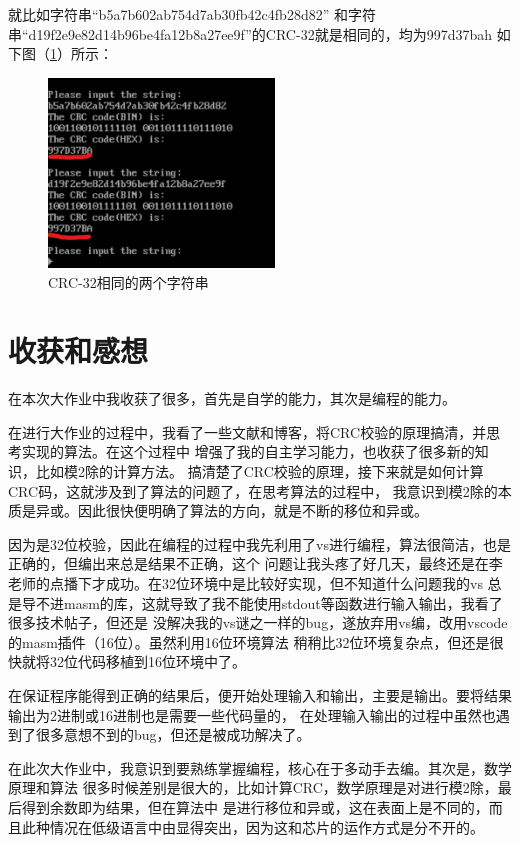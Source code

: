 \documentclass[UTF-8, a4paper, 12pt]{ctexart}
\begin{document}
就比如字符串“b5a7b602ab754d7ab30fb42c4fb28d82”
和字符串\newline “d19f2e9e82d14b96be4fa12b8a27ee9f”的CRC-32就是相同的，均为997d37bah
如下图（\ref{same}）所示：

\begin{figure}[htbp]
    \begin{center}
        \includegraphics[width=6cm]{fig/ff.jpg}
    \end{center}
    \caption{CRC-32相同的两个字符串}
    \label{same}
\end{figure}
\section{收获和感想}

在本次大作业中我收获了很多，首先是自学的能力，其次是编程的能力。

在进行大作业的过程中，我看了一些文献和博客，将CRC校验的原理搞清，并思考实现的算法。在这个过程中
增强了我的自主学习能力，也收获了很多新的知识，比如模2除的计算方法。
搞清楚了CRC校验的原理，接下来就是如何计算CRC码，这就涉及到了算法的问题了，在思考算法的过程中，
我意识到模2除的本质是异或。因此很快便明确了算法的方向，就是不断的移位和异或。

因为是32位校验，因此在编程的过程中我先利用了vs进行编程，算法很简洁，也是正确的，但编出来总是结果不正确，这个
问题让我头疼了好几天，最终还是在李老师的点播下才成功。在32位环境中是比较好实现，但不知道什么问题我的vs
总是导不进masm的库，这就导致了我不能使用stdout等函数进行输入输出，我看了很多技术帖子，但还是
没解决我的vs谜之一样的bug，遂放弃用vs编，改用vscode的masm插件（16位）。虽然利用16位环境算法
稍稍比32位环境复杂点，但还是很快就将32位代码移植到16位环境中了。

在保证程序能得到正确的结果后，便开始处理输入和输出，主要是输出。要将结果输出为2进制或16进制也是需要一些代码量的，
在处理输入输出的过程中虽然也遇到了很多意想不到的bug，但还是被成功解决了。

在此次大作业中，我意识到要熟练掌握编程，核心在于多动手去编。其次是，数学原理和算法
很多时候差别是很大的，比如计算CRC，数学原理是对进行模2除，最后得到余数即为结果，但在算法中
是进行移位和异或，这在表面上是不同的，而且此种情况在低级语言中由显得突出，因为这和芯片的运作方式是分不开的。
\end{document}
